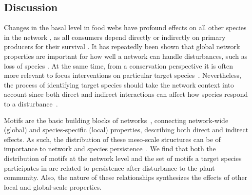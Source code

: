 \documentclass[12pt]{article}
\begin{document}
\begin{spacing}{2.0}
        


\clearpage



\section*{Discussion}




Changes in the basal level in food webs have profound effects on all other species in the network \citep{}, as all consumers depend directly or indirectly on primary producers for their survival \citep{}. It has repeatedly been shown that global network properties are important for how well a network can handle disturbances, such as loss of species \citep{Eklof2006, Dunne2002}. At the same time, from a conservation perspective it is often more relevant to focus interventions on particular target species~\citep{}. Nevertheless, the process of identifying target species should take the network context into account since both direct and indirect interactions can affect how species respond to a disturbance~\citep{}. 

Motifs are the basic building blocks of networks~\citep{Milo2002}, connecting network-wide (global) and species-specific (local) properties, describing both direct and indirect effects. As such, the distribution of these meso-scale structures can be of importance to network and species persistence~\citep{}.
We find that both the distribution of motifs at the network level and the set of motifs a target species participates in are related to persistence after disturbance to the plant community. Also, the nature of these relationships synthesizes the effects of other local and global-scale properties.


\end{spacing}
\end{document}

